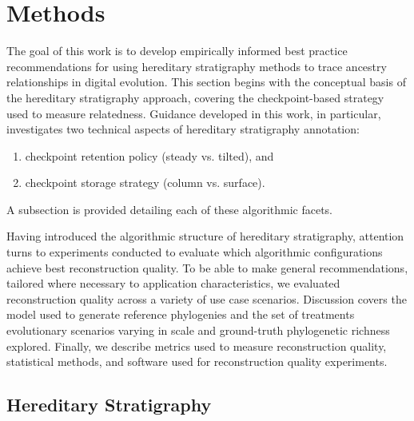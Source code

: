 \section{Methods} \label{sec:methods}

The goal of this work is to develop empirically informed best practice recommendations for using hereditary stratigraphy methods to trace ancestry relationships in digital evolution.
This section begins with the conceptual basis of the hereditary stratigraphy approach, covering the checkpoint-based strategy used to measure relatedness.
Guidance developed in this work, in particular, investigates two technical aspects of hereditary stratigraphy annotation:
\begin{enumerate}
\item checkpoint retention policy (steady vs. tilted), and
\item checkpoint storage strategy (column vs. surface).
\end{enumerate}
A subsection is provided detailing each of these algorithmic facets.

Having introduced the algorithmic structure of hereditary stratigraphy, attention turns to experiments conducted to evaluate which algorithmic configurations achieve best reconstruction quality.
To be able to make general recommendations, tailored where necessary to application characteristics, we evaluated reconstruction quality across a variety of use case scenarios.
Discussion covers the model used to generate reference phylogenies and the set of treatments evolutionary scenarios varying in scale and ground-truth phylogenetic richness explored.
Finally, we describe metrics used to measure reconstruction quality, statistical methods, and software used for reconstruction quality experiments.

\subsection{Hereditary Stratigraphy}

